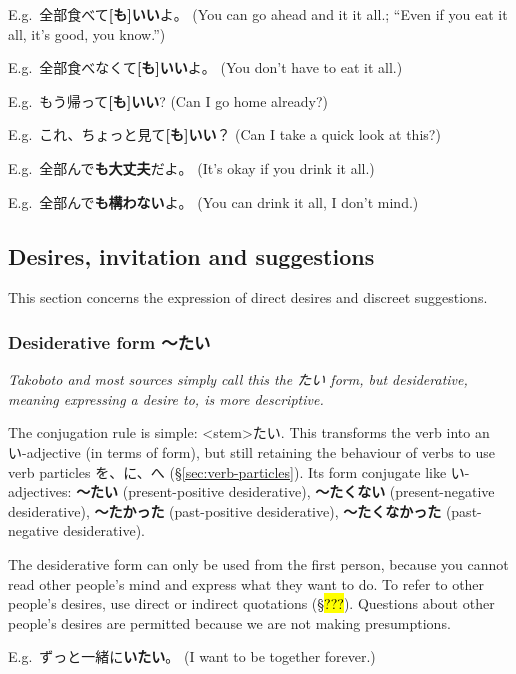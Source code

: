 \documentclass[../nihongo-gakushuu-kyouzai-grammar.tex]{subfiles}
\begin{document}
E.g.\ 全部食べて\textbf{[も]いい}よ。 (You can go ahead and it it all.; ``Even if you eat it all, it's good, you know.'')

E.g.\ 全部食べなくて\textbf{[も]いい}よ。 (You don't have to eat it all.)

E.g.\ もう帰って\textbf{[も]いい}? (Can I go home already?)

E.g.\ これ、ちょっと見て\textbf{[も]いい}？ (Can I take a quick look at this?)

E.g.\ 全部んで\textbf{も大丈夫}だよ。 (It's okay if you drink it all.)

E.g.\ 全部んで\textbf{も構わない}よ。 (You can drink it all, I don't mind.)


\subsection{Desires, invitation and suggestions} \label{sec:desires-invitation-and-suggestions}
This section concerns the expression of direct desires and discreet suggestions.


\subsubsection{Desiderative form 〜たい} \label{desiderative-form}
\emph{Takoboto and most sources simply call this the たい form, but desiderative, meaning expressing a desire to, is more descriptive.}

The conjugation rule is simple: <stem>たい. This transforms the verb into an い-adjective (in terms of form), but still retaining the behaviour of verbs to use verb particles を、に、へ (\S\ref{sec:verb-particles}). Its form conjugate like い-adjectives: \textbf{〜たい} (present-positive desiderative), \textbf{〜たくない} (present-negative desiderative), \textbf{〜たかった} (past-positive desiderative), \textbf{〜たくなかった} (past-negative desiderative).


The desiderative form can only be used from the first person, because you cannot read other people's mind and express what they want to do. To refer to other people's desires, use direct or indirect quotations (\S\hl{???}). Questions about other people's desires are permitted because we are not making presumptions.

E.g.\ ずっと一緒に\textbf{いたい}。 (I want to be together forever.)
\end{document}
